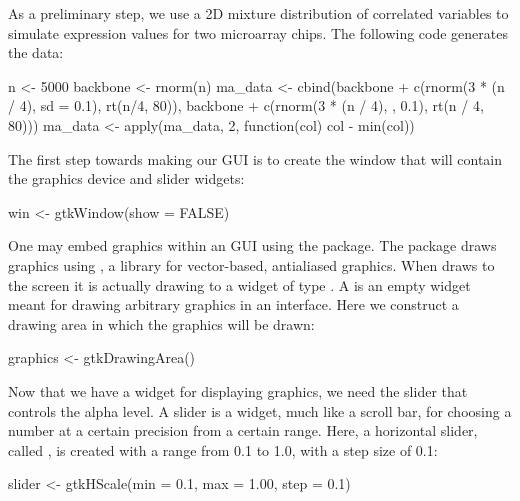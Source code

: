 \documentclass[article,shortnames]{jss}
\begin{document}
As a preliminary step, we use a 2D mixture distribution of correlated
variables to simulate expression values for two microarray chips. The
following code generates the data:
\begin{Code}
n <- 5000
backbone <- rnorm(n)
ma_data <- cbind(backbone + c(rnorm(3 * (n / 4), sd = 0.1), 
                              rt(n/4, 80)), 
                 backbone + c(rnorm(3 * (n / 4), , 0.1), 
                              rt(n / 4, 80)))
ma_data <- apply(ma_data, 2, function(col) col - min(col))
\end{Code}

The first step towards making our GUI is to create the window that
will contain the graphics device and slider widgets:
\begin{Code}
win <- gtkWindow(show = FALSE)
\end{Code}

One may embed  graphics within an  GUI using
the  \citep{cairoDevice} package. The  package draws
 graphics using  \citep{cairo}, a library for
vector-based, antialiased graphics.  When  draws to
the screen it is actually drawing to a  widget of type
. A  is an empty widget
meant for drawing arbitrary graphics in an interface. Here we
construct a drawing area in which the  graphics will be
drawn:
\begin{Code}
graphics <- gtkDrawingArea()
\end{Code}

Now that we have a widget for displaying  graphics, we
need the slider that controls the alpha level. A slider is a widget,
much like a scroll bar, for choosing a number at a certain precision
from a certain range. Here, a horizontal slider, called
, is created with a range from 0.1 to 1.0, with a
step size of 0.1:
\begin{Code}
slider <- gtkHScale(min = 0.1, max = 1.00, step = 0.1)
\end{Code}
\end{document}

